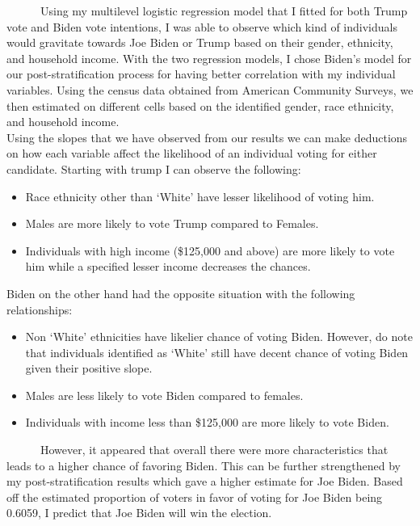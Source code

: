 \documentclass[
]{article}
\begin{document}
~~~~~~Using my multilevel logistic regression model that I fitted for
both Trump vote and Biden vote intentions, I was able to observe which
kind of individuals would gravitate towards Joe Biden or Trump based on
their gender, ethnicity, and household income. With the two regression
models, I chose Biden's model for our post-stratification process for
having better correlation with my individual variables. Using the census
data obtained from American Community Surveys, we then estimated on
different cells based on the identified gender, race ethnicity, and
household income.\\
\hspace*{0.333em}\hspace*{0.333em}\hspace*{0.333em}\hspace*{0.333em}\hspace*{0.333em}\hspace*{0.333em}Using
the slopes that we have observed from our results we can make deductions
on how each variable affect the likelihood of an individual voting for
either candidate. Starting with trump I can observe the following:

\begin{itemize}
\item
  Race ethnicity other than `White' have lesser likelihood of voting
  him.
\item
  Males are more likely to vote Trump compared to Females.
\item
  Individuals with high income (\$125,000 and above) are more likely to
  vote him while a specified lesser income decreases the chances.\\
\end{itemize}

Biden on the other hand had the opposite situation with the following
relationships:

\begin{itemize}
\item
  Non `White' ethnicities have likelier chance of voting Biden. However,
  do note that individuals identified as `White' still have decent
  chance of voting Biden given their positive slope.
\item
  Males are less likely to vote Biden compared to females.
\item
  Individuals with income less than \$125,000 are more likely to vote
  Biden.
\end{itemize}

~~~~~~However, it appeared that overall there were more characteristics
that leads to a higher chance of favoring Biden. This can be further
strengthened by my post-stratification results which gave a higher
estimate for Joe Biden. Based off the estimated proportion of voters in
favor of voting for Joe Biden being 0.6059, I predict that Joe Biden
will win the election.
\end{document}
